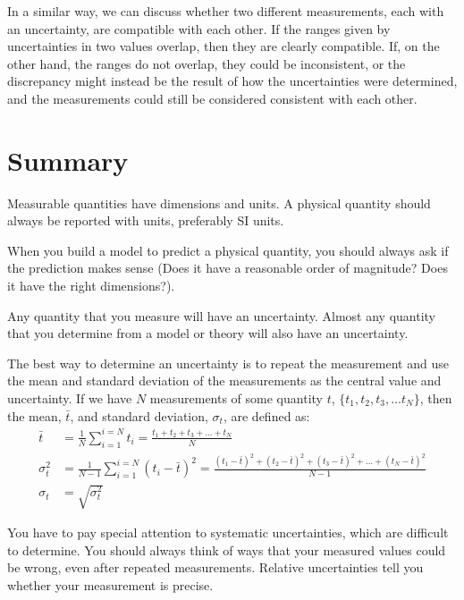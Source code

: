 In a similar way, we can discuss whether two different measurements, each with an uncertainty, are compatible with each other. If the ranges given by uncertainties in two values overlap, then they are clearly compatible. If, on the other hand, the ranges do not overlap, they could be inconsistent, or the discrepancy might instead be the result of how the uncertainties were determined, and the measurements could still be considered consistent with each other. 

\newpage
\section{Summary}
\vspace{0.5cm}
%
\begin{chapterSummary}
Measurable quantities have dimensions and units. A physical quantity should always be reported with units, preferably SI units.

When you build a model to predict a physical quantity, you should always ask if the prediction makes sense (Does it have a reasonable order of magnitude? Does it have the right dimensions?).

Any quantity that you measure will have an uncertainty. Almost any quantity that you determine from a model or theory will also have an uncertainty.

The best way to determine an uncertainty is to repeat the measurement and use the mean and standard deviation of the measurements as the central value and uncertainty. 
If we have $N$ measurements of some quantity $t$, $\{t_1, t_2, t_3, \dots t_N\}$, then the mean, $\bar t$, and standard deviation, $\sigma_t$, are defined as:
\begin{align*}
\bar t &= \frac{1}{N}\sum_{i=1}^{i=N} t_i=\frac{t_1 +t_2 +t_3 +\dots+ t_N}{N} \\
\sigma_t^2 &=\frac{1}{N-1}\sum_{i=1}^{i=N}(t_i-\bar t)^2 = \frac{(t_1-\bar t)^2+(t_2-\bar t)^2+(t_3-\bar t)^2+\dots+(t_N-\bar t)^2}{N-1} \\
\sigma_t &=\sqrt{\sigma_t^2}
\end{align*}

You have to pay special attention to systematic uncertainties, which are difficult to determine. You should always think of ways that your measured values could be wrong, even after repeated measurements. Relative uncertainties tell you whether your measurement is precise.


\end{chapterSummary}
